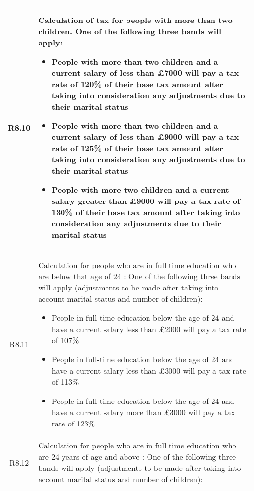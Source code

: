 \begin{table}[H]
\small
\centering
\begin{tabularx}{\textwidth}{| c | X |}
    \hline %
    \label{req:r8-10}
    R8.10 & Calculation of tax for people with more than two children. One of the following three bands will apply:
    \begin{itemize}[itemsep=\tableitemsep, leftmargin=\tableleftsep]
        \item People with more than two children and a current salary of less than £7000 will pay a tax rate of 120\% of their base tax amount after taking into consideration any adjustments due to their marital status
        \item People with more than two children and a current salary of less than £9000 will pay a tax rate of 125\% of their base tax amount after taking into consideration any adjustments due to their marital status
        \item People with more two children and a current salary greater than £9000 will pay a tax rate of 130\% of their base tax amount after taking into consideration any adjustments due to their marital status
    \end{itemize}
    \\
    \hline %
    \label{req:r8-11}
    R8.11 & Calculation for people who are in full time education who are below that age of 24 : One of the following three bands will apply (adjustments to be made after taking into account marital status and number of children):
    \begin{itemize}[itemsep=\tableitemsep, leftmargin=\tableleftsep]
        \item People in full-time education below the age of 24 and have a current salary less than £2000 will pay a tax rate of 107\%
        \item People in full-time education below the age of 24 and have a current salary less than £3000 will pay a tax rate of 113\%
        \item People in full-time education below the age of 24 and have a current salary more than £3000 will pay a tax rate of 123\%
    \end{itemize}
    \\
    \hline %
    \label{req:r8-12}
    R8.12 & Calculation for people who are in full time education who are 24 years of age and above : One of the following three bands will apply (adjustments to be made after taking into account marital status and number of children):

\end{tabularx}
\end{table}
